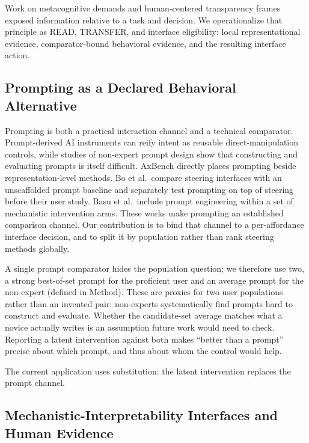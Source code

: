 \documentclass[manuscript,review,anonymous]{acmart}
\begin{document}
Work on metacognitive demands and human-centered transparency frames exposed information relative to a task and decision. \cite{tankelevitch2024metacog,liao2024transparency} {}%
We operationalize that principle as READ, TRANSFER, and interface eligibility: local representational evidence, comparator-bound behavioral evidence, and the resulting interface action.

\subsection{Prompting as a Declared Behavioral Alternative}\label{prompting-as-a-declared-behavioral-alternative}

Prompting is both a practical interaction channel and a technical comparator. Prompt-derived AI instruments can reify intent as reusable direct-manipulation controls, while studies of non-expert prompt design show that constructing and evaluating prompts is itself difficult. \cite{riche2025aiinstr,zamfirescuPereira2023johnny} AxBench directly places prompting beside representation-level methods. {}%
Bo et al.~compare steering interfaces with an unscaffolded prompt baseline and separately test prompting on top of steering before their user study. \cite{bo2026steerable} {}%
Basu et al.~include prompt engineering within a set of mechanistic intervention arms. {}%
These works make prompting an established comparison channel. Our contribution is to bind that channel to a per-affordance interface decision, and to split it by population rather than rank steering methods globally.

A single prompt comparator hides the population question; we therefore use two, a strong best-of-set prompt for the proficient user and an average prompt for the non-expert (defined in Method). {}%
{}%
These are proxies for two user populations rather than an invented pair: non-experts systematically find prompts hard to construct and evaluate. \cite{zamfirescuPereira2023johnny} Whether the candidate-set average matches what a novice actually writes is an assumption future work would need to check. Reporting a latent intervention against both makes ``better than a prompt'' precise about which prompt, and thus about whom the control would help.

The current application uses substitution: the latent intervention replaces the prompt channel. {}%

\subsection{Mechanistic-Interpretability Interfaces and Human Evidence}\label{mechanistic-interpretability-interfaces-and-human-evidence}
\end{document}
